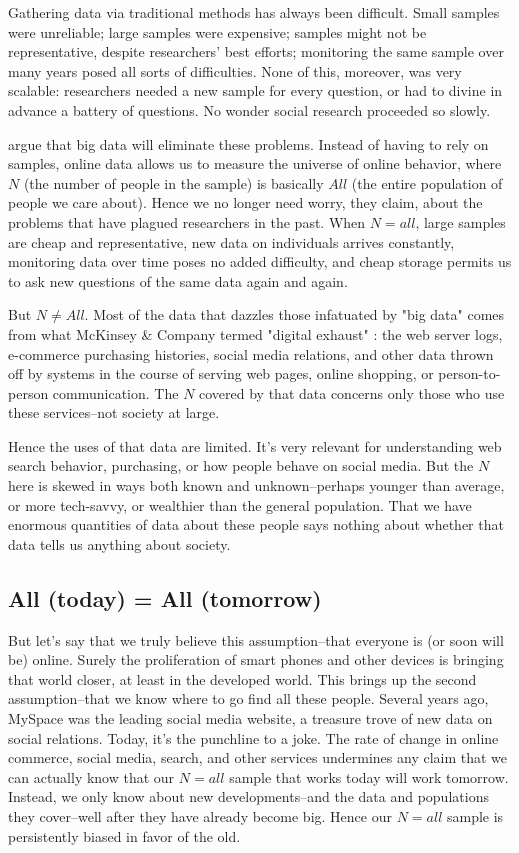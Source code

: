 \documentclass[12pt]{article}
\begin{document}
Gathering data via traditional methods has always been
difficult. Small samples were unreliable; large samples were
expensive; samples might not be representative, despite researchers'
best efforts; monitoring the same sample over many years posed all
sorts of difficulties. None of this, moreover, was very scalable:
researchers needed a new sample for every question, or had to divine
in advance a battery of questions. No wonder social
research proceeded so slowly.

\cite{mayer2013big} argue that big data will eliminate these
problems. Instead of having to rely on samples, online data allows us
to measure the universe of online behavior, where $N$ (the number of
people in the sample) is basically $All$ (the entire population of
people we care about). Hence we no longer need worry, they claim,
about the problems that have plagued researchers in the past. When
$N=all$, large samples are cheap and representative, new data on
individuals arrives constantly,  monitoring data over time poses no
added difficulty, and cheap storage permits us to ask new questions of
the same data again and again.

But $N\neq All$. Most of the data that dazzles those infatuated by
"big data" comes from what McKinsey \& Company termed "digital
exhaust" \citep{mckinsey2011}: the web server logs, e-commerce
purchasing histories, social media relations, and other data thrown
off by systems in the course of serving web pages, online shopping,
or person-to-person communication. The $N$ covered by that data
concerns only those who use these services--not society at large. 

Hence the uses of that data are limited. It's very relevant for
understanding web search behavior, purchasing, or how people behave on
social media. But the $N$ here is skewed in ways both known and
unknown--perhaps younger than average, or more tech-savvy, or
wealthier than the general population. That we have enormous
quantities of data about these people says nothing about whether that
data tells us anything about society.



\subsection{All (today) = All (tomorrow)}
\label{sec:all-today-tomorrow}

But let's say that we truly believe this assumption--that everyone is
(or soon will be) online. Surely the proliferation of smart phones and
other devices is bringing that world closer, at least in the developed
world. This brings up the second assumption--that we know where to go
find all these people. Several years ago, MySpace was the leading
social media website, a treasure trove of new data on social
relations. Today, it's the punchline to a joke. The rate of change in
online commerce, social media, search, and other services undermines
any claim that we can actually know that our $N=all$ sample that works
today will work tomorrow. Instead, we only know about new
developments--and the data and populations they cover--well after they
have already become big. Hence our $N=all$ sample is persistently
biased in favor of the old.
\end{document}

